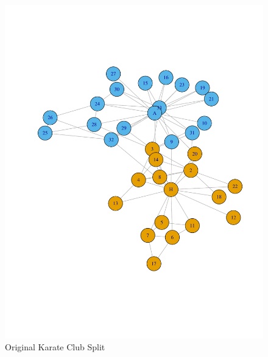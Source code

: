 \documentclass[letterpaper,11pt]{article}
\begin{document}
\begin{figure}[h]
\centering
\includegraphics[scale=0.6]{originalSplit.pdf}
\caption{Original Karate Club Split}
\label{fig:q1orig}
\end{figure}
\end{document}
